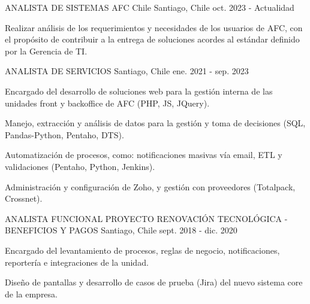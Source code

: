 

\begin{cventries}

  \cventry
  {ANALISTA DE SISTEMAS} %
  {AFC Chile} %
  {Santiago, Chile} %
  {oct. 2023 - Actualidad} %
  {
    \begin{cvitems} %
      \item {Realizar análisis de los requerimientos y necesidades de los usuarios de AFC, con el propósito de contribuir a la entrega de soluciones acordes al estándar definido por la Gerencia de TI.} 
    \end{cvitems}
  }%

  \cventry
    {ANALISTA DE SERVICIOS} %
    {} %
    {Santiago, Chile} %
    {ene. 2021 - sep. 2023} %
    {
      \begin{cvitems} %
        \item {Encargado del desarrollo de soluciones web para la gestión interna de las unidades front y backoffice de AFC (PHP, JS, JQuery).} 
        \item {Manejo, extracción y análisis de datos para la gestión y toma de decisiones (SQL, Pandas-Python, Pentaho, DTS).}
        \item {Automatización de procesos, como: notificaciones masivas vía email, ETL y validaciones (Pentaho, Python, Jenkins).}
        \item {Administración y configuración de Zoho, y gestión con proveedores (Totalpack, Crossnet).}
      \end{cvitems}
    }%

  \cventry
    {ANALISTA FUNCIONAL PROYECTO RENOVACIÓN TECNOLÓGICA - BENEFICIOS Y PAGOS} %
    {} %
    {Santiago, Chile} %
    {sept. 2018 - dic. 2020} %
    {
      \begin{cvitems} %
        \item {Encargado del levantamiento de procesos, reglas de negocio, notificaciones, reportería e integraciones de la unidad.}
        \item {Diseño de pantallas y desarrollo de casos de prueba (Jira) del nuevo sistema core de la empresa.}
      \end{cvitems}
    }%


\end{cventries}
